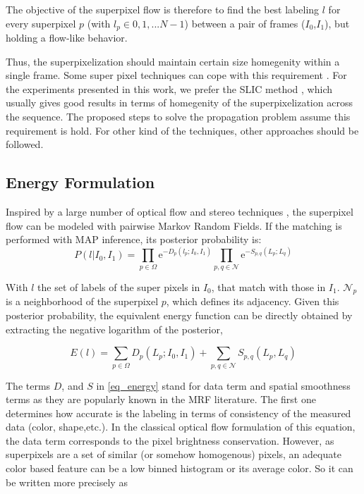 The objective of the superpixel flow is therefore to find the best labeling $l$ for every superpixel $p$
(with $l_p \in {0,1,...N-1}$) between a pair of frames ($I_{0}$,$I_{1}$), but holding a flow-like behavior.

Thus, the superpixelization should maintain certain size homegenity within a single frame. Some super
pixel techniques can cope with this requirement \cite{c9}\cite{c10}. For the experiments presented 
in this work, we prefer the SLIC method \cite{c9}, which usually gives
good results in terms of homegenity of the superpixelization across the sequence. 
The proposed steps to solve the propagation problem assume this requirement is hold. 
For other kind of the techniques, other approaches should be followed.


\subsection{Energy Formulation}

Inspired by a large number of optical flow and stereo techniques \cite{c7}\cite{c12}\cite{c13}, 
the superpixel flow can be modeled with pairwise Markov Random Fields. If
the matching is performed with MAP inference, its posterior probability is: 
\begin{equation}
 P(l|I_0,I_1) = \displaystyle \prod_{p \in \Omega} \mathrm{e}^{-D_p(l_p;I_0,I_1)} 
\prod_{p,q \in \mathcal{N}} \mathrm{e}^{-S_{p,q}(L_p;L_q)} 
\label{eq_prob}
\end{equation}

With $l$ the set of labels of the super pixels in $I_0$,
that match with those in $I_1$.
$ \mathcal{N}_p $ is a neighborhood of the
superpixel $p$, which defines its adjacency. Given this posterior probability,
the equivalent energy function can be directly obtained
by extracting the negative logarithm of the posterior,

\begin{equation}
E(l) = \displaystyle \sum_{p \in \Omega} D_p(L_p;I_0,I_1) +
\sum_{p,q \in \mathcal{N}} S_{p,q}(L_p,L_q)
\label{eq_energy}
\end{equation}

The terms $D$, and $S$ in \ref{eq_energy} stand for data term and spatial smoothness terms as they
are popularly known in the MRF literature. The first one determines how accurate is the labeling in terms
of consistency of the measured data (color, shape,etc.). In the classical optical flow formulation of this equation,
the data term corresponds to the pixel brightness conservation\cite{c7}\cite{c5}. However, as superpixels are a set
of similar (or somehow homogenous) pixels, an adequate color based feature can be a low binned
histogram or its average color. So it can be written more precisely as

